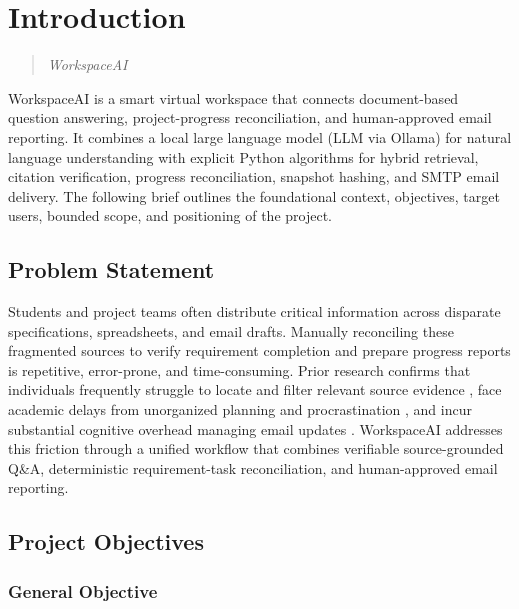 
\chapter{Introduction}
\label{chap:introduction}

\begin{quote}\itshape WorkspaceAI \end{quote}

WorkspaceAI is a smart virtual workspace that connects document-based question answering, project-progress reconciliation, and human-approved email reporting. It combines a local large language model (LLM via Ollama) for natural language understanding with explicit Python algorithms for hybrid retrieval, citation verification, progress reconciliation, snapshot hashing, and SMTP email delivery. The following brief outlines the foundational context, objectives, target users, bounded scope, and positioning of the project.

\section{Problem Statement}

Students and project teams often distribute critical information across disparate specifications, spreadsheets, and email drafts. Manually reconciling these fragmented sources to verify requirement completion and prepare progress reports is repetitive, error-prone, and time-consuming. Prior research confirms that individuals frequently struggle to locate and filter relevant source evidence \cite{head2011everyday}, face academic delays from unorganized planning and procrastination \cite{shatz2026procrastination, aeon2021timemanagement}, and incur substantial cognitive overhead managing email updates \cite{mark2016email}. WorkspaceAI addresses this friction through a unified workflow that combines verifiable source-grounded Q\&A, deterministic requirement-task reconciliation, and human-approved email reporting.

\section{Project Objectives}

\subsection*{General Objective}

